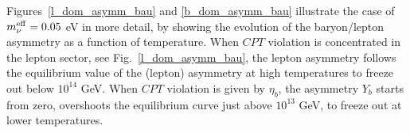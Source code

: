 \documentclass[12pt]{revtex4}
\newcommand{\meff}{m^{\rm eff}_\nu}
\newcommand{\GeV}{{\rm GeV}}
\newcommand{\eV}{{\rm eV}}
\begin{document}
	

	Figures~\ref{l_dom_asymm_bau} and \ref{b_dom_asymm_bau} illustrate the 
	case of $\meff=0.05$ eV in more detail, by showing the evolution of the baryon/lepton
	asymmetry as a function of temperature. When $CPT$ violation is concentrated in the 
lepton sector, see Fig.~\ref{l_dom_asymm_bau}, the lepton asymmetry follows the 
equilibrium value of the (lepton)
	asymmetry at high temperatures to freeze out below $10^{14}$ GeV.
When $CPT$ violation is given by $\eta_b$, the asymmetry $ Y_b $ starts from zero, 
    overshoots the equilibrium curve just above $10^{13}$ GeV, to freeze out
	at lower temperatures. 
\end{document}
